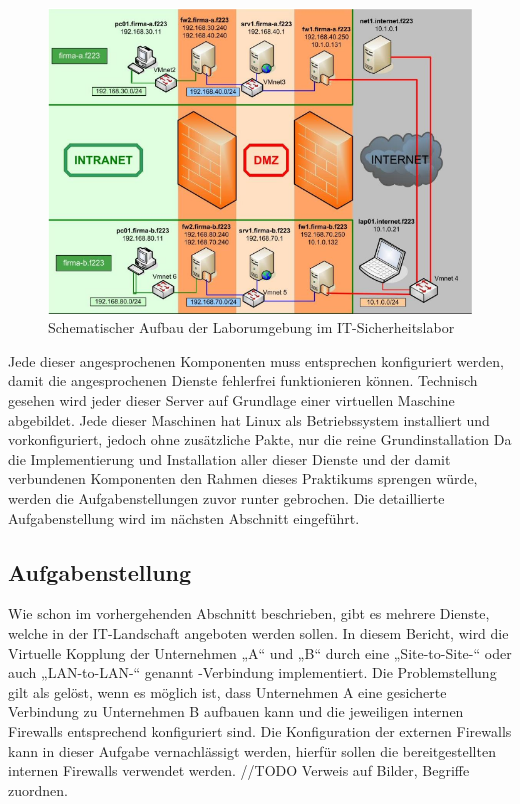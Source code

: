 \documentclass[
a4paper,     %
 headsepline, %
footsepline, %
titlepage,   %
 halfparskip,     %
 fleqn,       %
12pt         %
]{scrartcl}  %
\begin{document}
\begin{figure}[h]
	\includegraphics[width=\textwidth]{pictures/laborumgebung.png}
	\caption{Schematischer Aufbau der Laborumgebung im IT-Sicherheitslabor \cite{JueNeuSaDue}}
	\label{fig:appStat}
\end{figure}

Jede dieser angesprochenen Komponenten muss entsprechen konfiguriert werden, damit die angesprochenen Dienste fehlerfrei funktionieren können.
Technisch gesehen wird jeder dieser Server auf Grundlage einer virtuellen Maschine abgebildet.
Jede dieser Maschinen hat Linux als Betriebssystem installiert und vorkonfiguriert, jedoch ohne zusätzliche Pakte, nur die reine Grundinstallation   
Da die Implementierung und Installation aller dieser Dienste und der damit verbundenen Komponenten den Rahmen dieses Praktikums sprengen würde, werden die Aufgabenstellungen zuvor runter gebrochen. Die detaillierte Aufgabenstellung wird im nächsten Abschnitt eingeführt.

\subsection{Aufgabenstellung}\label{kap:Aufgabenstellung}
Wie schon im vorhergehenden Abschnitt beschrieben, gibt es mehrere Dienste, welche in der IT-Landschaft angeboten werden sollen. 
In diesem Bericht, wird die Virtuelle Kopplung der Unternehmen „A“ und „B“ durch eine „Site-to-Site-“ oder auch „LAN-to-LAN-“ genannt -Verbindung implementiert. 
Die Problemstellung gilt als gelöst, wenn es möglich ist, dass Unternehmen A eine gesicherte Verbindung zu Unternehmen B aufbauen kann und die jeweiligen internen Firewalls entsprechend konfiguriert sind. Die Konfiguration der externen Firewalls kann in dieser Aufgabe vernachlässigt werden, hierfür sollen die bereitgestellten internen Firewalls verwendet werden. 
//TODO Verweis auf Bilder, Begriffe zuordnen. 
 
\end{document}
